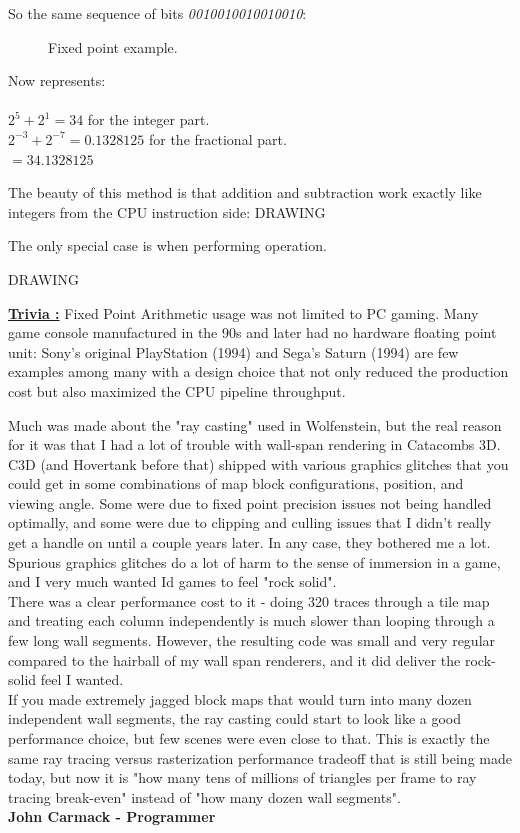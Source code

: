 \documentclass[book.tex]{subfiles}
\begin{document}
So the same sequence of bits \emph{0010010010010010}:
\begin{figure}[H]
 \centering
   
  \caption{Fixed point example.} \label{fig:mips}
\end{figure} 

Now represents:\\
\\
$ 2^5 + 2^1 = 34 $ for the integer part.\\
$ 2^{-3}+2^{-7} = 0.1328125 $ for the fractional part.\\
$ = 34.1328125$\\

\bigskip

The beauty of this method is that addition and subtraction work exactly like integers from the CPU instruction side:
  \bigskip
  DRAWING
  \bigskip


 The only special case is when performing operation.

\bigskip
  DRAWING
  \bigskip



 \textbf{\underline{Trivia :}}  Fixed Point Arithmetic usage was not limited to PC gaming. Many game console manufactured in the 90s and later had no hardware floating point unit: Sony's original PlayStation (1994) and Sega's Saturn (1994) are few examples among many with a design choice that not only reduced the production cost but also maximized the CPU pipeline throughput.
 
 
 
\begin{fancyquotes}
Much was made about the "ray casting" used in Wolfenstein, but the real reason for it was that I had a lot of trouble with wall-span rendering in Catacombs 3D.  C3D (and Hovertank before that) shipped with various graphics glitches that you could get in some combinations of map block configurations, position, and viewing angle.  Some were due to fixed point precision issues not being handled optimally, and some were due to clipping and culling issues that I didn't really get a handle on until a couple years later.  In any case, they bothered me a lot.  Spurious graphics glitches do a lot of harm to the sense of immersion in a game, and I very much wanted Id games to feel "rock solid".
 \bigskip \\
There was a clear performance cost to it - doing 320 traces through a tile map and treating each column independently is much slower than looping through a few long wall segments.  However, the resulting code was small and very regular compared to the hairball of my wall span renderers, and it did deliver the rock-solid feel I wanted.
 \bigskip \\
If you made extremely jagged block maps that would turn into many dozen independent wall segments, the ray casting could start to look like a good performance choice, but few scenes were even close to that.  This is exactly the same ray tracing versus rasterization performance tradeoff that is still being made today, but now it is "how many tens of millions of triangles per frame to ray tracing break-even" instead of "how many dozen wall segments".
 \bigskip \\
\textbf{John Carmack - Programmer}
 \end{fancyquotes}
 
\end{document}
